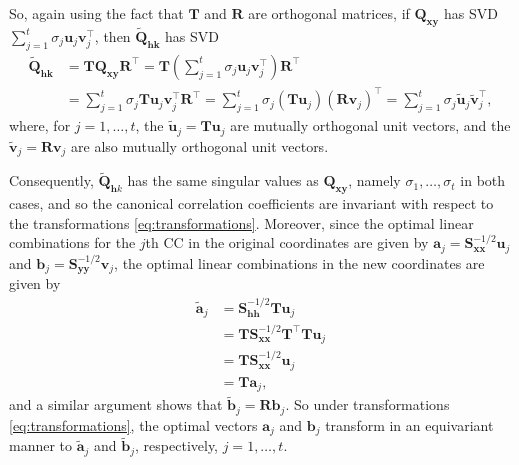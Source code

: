 \documentclass[]{book}
\theoremstyle{definition}
\theoremstyle{definition}
\theoremstyle{definition}
\theoremstyle{remark}
\begin{document}
So, again using the fact that \(\mathbf T\) and \(\mathbf R\) are orthogonal matrices, if \(\boldsymbol Q_{\boldsymbol x\boldsymbol y}\) has SVD \(\sum_{j=1}^t \sigma_j {\mathbf u}_j {\mathbf v}_j^\top\), then \(\tilde{\boldsymbol Q}_{\boldsymbol h\boldsymbol k}\) has SVD
\begin{align*}
\tilde{\boldsymbol Q}_{\boldsymbol h\boldsymbol k}&={\mathbf T }\boldsymbol Q_{\boldsymbol x\boldsymbol y}{\mathbf R}^\top
={\mathbf T} \left ( \sum_{j=1}^t \sigma_j {\mathbf u}_j {\mathbf v}_j^\top \right){\mathbf R}^\top\\
&=\sum_{j=1}^t \sigma_j {\mathbf T}{\mathbf u}_j {\mathbf v}_j^\top {\mathbf R}^\top
=\sum_{j=1}^t \sigma_j \left ( {\mathbf T} {\mathbf u}_j \right )\left ({\mathbf R}{\mathbf v}_j  \right )^\top
=\sum_{j=1}^t \sigma_j \tilde{\boldsymbol u}_j \tilde{\mathbf v}_j^\top,
\end{align*}
where, for \(j=1, \ldots,t\), the \(\tilde{\boldsymbol u}_j={\mathbf T}\boldsymbol u_j\) are mutually orthogonal unit vectors,
and the \(\tilde{\mathbf v}_j={\mathbf R}{\mathbf v}_j\) are also mutually orthogonal unit vectors.

Consequently, \(\tilde{\boldsymbol Q}_{\mathbf h k}\) has the same singular values as \(\boldsymbol Q_{\boldsymbol x\boldsymbol y}\), namely \(\sigma_1, \ldots , \sigma_t\) in both cases, and so the canonical correlation coefficients are invariant with respect to the transformations \eqref{eq:transformations}. Moreover, since the optimal linear combinations for the \(j\)th CC in the original coordinates are given by \(\boldsymbol a_j =\boldsymbol S_{\boldsymbol x\boldsymbol x}^{-1/2}{\mathbf u}_j\) and \(\boldsymbol b_j=\boldsymbol S_{\boldsymbol y\boldsymbol y}^{-1/2}{\mathbf v}_j\), the optimal linear combinations in the new coordinates are given by
\begin{align*}
\tilde{\boldsymbol a}_{j}&=\boldsymbol S_{\boldsymbol h\boldsymbol h}^{-1/2}{\mathbf T}{\mathbf u}_j\\
&={\mathbf T}\boldsymbol S_{\boldsymbol x\boldsymbol x}^{-1/2}{\mathbf T}^\top {\mathbf T}{\mathbf u}_j\\
&={\mathbf T}\boldsymbol S_{\boldsymbol x\boldsymbol x}^{-1/2}{\mathbf u}_j \\
&={\mathbf T}\boldsymbol a_{j},
\end{align*}
and a similar argument shows that \(\tilde{\boldsymbol b}_{j}={\mathbf R}\boldsymbol b_{j}\). So under transformations \eqref{eq:transformations},
the optimal vectors \(\boldsymbol a_{j}\) and \(\boldsymbol b_{j}\) transform in an equivariant manner to \(\tilde{\boldsymbol a}_{j}\) and \(\tilde{\boldsymbol b}_{j}\), respectively, \(j=1, \ldots , t\).
\end{document}

